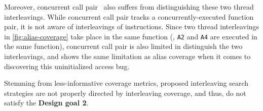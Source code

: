 Moreover, concurrent call pair~\cite{conzzer} also suffers from
distinguishing these two thread interleavings.
%
While concurrent call pair tracks a concurrently-executed function
pair, it is not aware of interleavings of instructions.
%
Since two thread interleavings in \autoref{fig:alias-coverage} take
place in the same function (\ie, \texttt{A2} and \texttt{A4} are
executed in the same function), concurrent call pair is also limited
in distinguish the two interleavings, and shows the same limitation as
alias coverage when it comes to discovering this uninitialized access
bug.










%
Stemming from less-informative coverage metrics, proposed interleaving
search strategies are not properly directed by interleaving coverage,
and thus, do not satisfy the \textbf{Design goal 2}.

